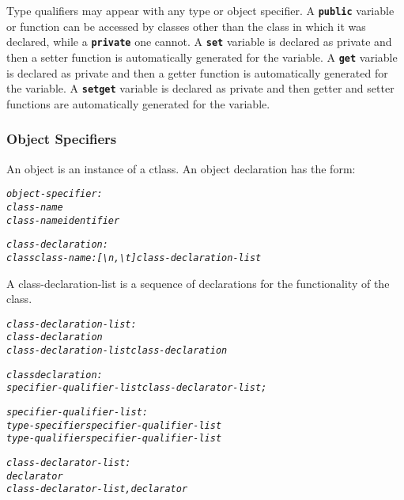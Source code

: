 \documentclass[12pt]{report}
\begin{document}
Type qualifiers may appear with any type or object specifier. A \textbf{\texttt{public}} variable or function can be accessed by classes other than the class in which it was declared, while a \textbf{\texttt{private}} one cannot. A \textbf{\texttt{set}} variable is declared as private and then a setter function is automatically generated for the variable. A \textbf{\texttt{get}} variable is declared as private and then a getter function is automatically generated for the variable. A \textbf{\texttt{setget}} variable is declared as private and then getter and setter functions are automatically generated for the variable.

\subsubsection{Object Specifiers}

An object is an instance of a ctlass. An object declaration has the form:

\begin{alltt}\begin{singlespace}
         \textit{object-specifier:}
              \textit{class-name}
              \textit{class-name identifier}
              
         \textit{class-declaration:}
              \textit{class class-name: [\textbackslash{n}, \textbackslash{t}] class-declaration-list}\end{singlespace}
\end{alltt}

A class-declaration-list is a sequence of declarations for the functionality of the class.

\begin{alltt}\begin{singlespace}
         \textit{class-declaration-list:}
              \textit{class-declaration}
              \textit{class-declaration-list class-declaration}
              
         \textit{class declaration:}
              \textit{specifier-qualifier-list class-declarator-list;}
              \textit{}
              
         \textit{specifier-qualifier-list:}
              \textit{type-specifier specifier-qualifier-list}
              \textit{type-qualifier specifier-qualifier-list}
              
         \textit{class-declarator-list:}
              \textit{declarator}
              \textit{class-declarator-list, declarator}\end{singlespace}
\end{alltt}
\end{document}
